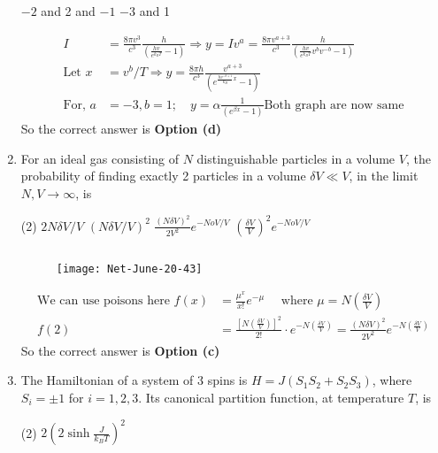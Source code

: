 \begin{enumerate}
\begin{tasks}
	\task[\textbf{b.}]$-2$ and 2
	 and $-1$
	\task[\textbf{d.}] $-3$ and 1
\end{tasks}
\begin{answer}
	\begin{align*}
	I&=\frac{8 \pi v^{3}}{c^{3}} \frac{h}{\left(\frac{h v}{e^{k_{B} T}}-1\right)} \Rightarrow y=I v^{a}=\frac{8 \pi v^{a+3}}{c^{3}} \frac{h}{\left(\frac{h v}{e^{k_{B} T}} v^{b} v^{-b}-1\right)}\\
	\text{Let }x&=v^{b} / T \Rightarrow y=\frac{8 \pi h}{c^{3}} \frac{v^{a+3}}{\left(e^{\frac{h v^{-b+1}}{k_{B}} x}-1\right)}\\
	\text{For, }a&=-3, b=1 ; \quad y=\alpha \frac{1}{\left(e^{\beta x}-1\right)}\text{Both graph are now same}
	\end{align*}
	So the correct answer is \textbf{Option (d)}
\end{answer}
\item For an ideal gas consisting of $N$ distinguishable particles in a volume $V$, the probability of finding exactly 2 particles in a volume $\delta V \ll V$, in the limit $N, V \rightarrow \infty$, is
 \begin{tasks}(2)
	\task[\textbf{a.}] $2 N \delta V / V$
	\task[\textbf{b.}]$(N \delta V / V)^{2}$
	\task[\textbf{c.}]$\frac{(N \delta V)^{2}}{2 V^{2}} e^{-N o V / V}$
	\task[\textbf{d.}]  $\left(\frac{\delta V}{V}\right)^{2} e^{-N o V / V}$
\end{tasks}
\begin{answer}$\left. \right. $
	\begin{figure}[H]
		\centering
		\texttt{[image: Net-June-20-43]}
	\end{figure}
	\begin{align*}
	\text{We can use poisons here }f(x)&=\frac{\mu^{x}}{x !} e^{-\mu}\quad
\text{	where }\mu=N\left(\frac{\delta V}{V}\right)\\
f(2)&=\frac{\left[N\left(\frac{\delta V}{V}\right)\right]^{2}}{2 !} \cdot e^{-N\left(\frac{\delta V}{V}\right)}=\frac{(N \delta V)^{2}}{2 V^{2}} e^{-N\left(\frac{\delta V}{V}\right)}
	\end{align*}
		So the correct answer is \textbf{Option (c)}
\end{answer}
\item The Hamiltonian of a system of 3 spins is $H=J\left(S_{1} S_{2}+S_{2} S_{3}\right)$, where $S_{i}=\pm 1$ for $i=1,2,3$. Its canonical partition function, at temperature $T$, is
 \begin{tasks}(2)
	\task[\textbf{a.}]$2\left(2 \sinh \frac{J}{k_{B} T}\right)^{2}$

\end{tasks}
\end{enumerate}
